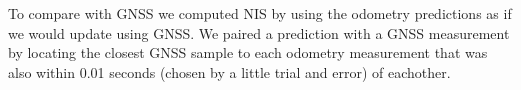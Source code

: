 To compare with GNSS we computed NIS by using the odometry predictions
as if we would update using GNSS. We paired a prediction with a GNSS
measurement by locating the closest GNSS sample to each odometry measurement
that was also within 0.01 seconds (chosen by a little trial and error) 
of eachother.